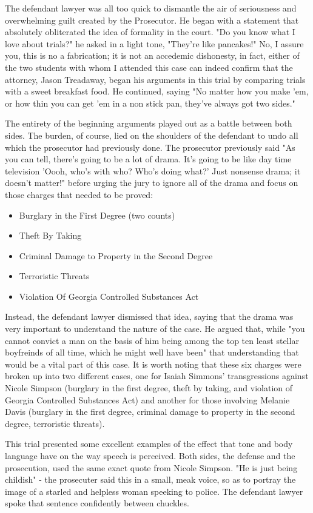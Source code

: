 \documentclass[a4paper,titlepage,12pt]{turabian-researchpaper}
\begin{document}
The defendant lawyer was all too quick to dismantle the air of seriousness and
overwhelming guilt created by the Prosecutor. He began with a statement that
absolutely obliterated the idea of formality in the court. "Do you know what I
love about trials?" he asked in a light tone, "They're like pancakes!" No, I
assure you, this is no a fabrication; it is not an accedemic dishonesty, in
fact, either of the two students with whom I attended this case can indeed
confirm that the attorney, Jason Treadaway, began his arguments in this trial by
comparing trials with a sweet breakfast food. He continued, saying "No matter
how you make 'em, or how thin you can get 'em in a non stick pan, they've
always got two sides."

The entirety of the beginning arguments played out as a battle between both
sides. The burden, of course, lied on the shoulders of the defendant to undo
all which the prosecutor had previously done. The prosecutor previously
said "As you can tell, there's going to be a lot of drama. It's going to be
like day time television 'Oooh, who's with who? Who's doing what?' Just
nonsense drama; it doesn't matter!" before urging the jury to ignore all of the
drama and focus on those charges that needed to be proved:
\begin{itemize}
  \item Burglary in the First Degree (two counts)
  \item Theft By Taking
  \item Criminal Damage to Property in the Second Degree
  \item Terroristic Threats
  \item Violation Of Georgia Controlled Substances Act
\end{itemize}
Instead, the defendant lawyer dismissed that idea, saying that the drama
was very important to understand the nature of the case. He argued that, while
"you cannot convict a man on the basis of him being among the top ten least
stellar boyfreinds of all time, which he might well have been" that
understanding that would be a vital part of this case.
It is worth noting that these six charges were broken up into two different
cases, one for Isaiah Simmons' transgressions against Nicole Simpson (burglary
in the first degree, theft by taking, and violation of Georgia Controlled
Substances Act) and
another for those involving Melanie Davis (burglary in the first degree,
criminal damage to property in the second degree, terroristic threats).

This trial presented some excellent examples of the effect that tone and body
language have on the way speech is perceived. Both sides, the defense and the
prosecution, used the same exact  quote from Nicole Simpson. "He is just being
childish" - the prosecuter said this in a small, meak voice, so as to portray
the image of a starled and helpless woman speeking to police. The defendant
lawyer spoke that sentence confidently between chuckles. 
\end{document}
